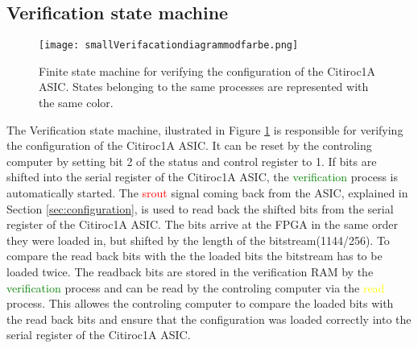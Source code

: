 \subsection{Verification state machine}
\begin{figure}[H]
    \centering
    \texttt{[image: smallVerifacationdiagrammodfarbe.png]}%
    \caption{Finite state machine for verifying the configuration of the Citiroc1A ASIC.
    States belonging to the same processes are represented with the same color.}
    \label{fig:Verification_state_machine}
\end{figure}
The Verification state machine, ilustrated in Figure \ref{fig:Verification_state_machine} is responsible for verifying the configuration of the Citiroc1A ASIC.
\newline
It can be reset by the controling computer by setting bit 2 of the status and control register to 1.
\newline
If bits are shifted into the serial register of the Citiroc1A ASIC, the \textcolor{green}{verification} process is automatically started.
The \textcolor{red}{srout} signal coming back from the ASIC, explained in Section \ref{sec:configuration}, is used to read back the shifted bits from the serial register of the Citiroc1A ASIC.
The bits arrive at the FPGA in the same order they were loaded in, but shifted by the length of the bitstream(1144/256). To compare the read back bits with the the loaded bits the bitstream has to be loaded twice.
\newline
The readback bits are stored in the verification RAM by the \textcolor{green}{verification} process and can be read by the controling computer via the  \textcolor{yellow}{read} process.
This allowes the controling computer to compare the loaded bits with the read back bits and ensure that the configuration was loaded correctly into the serial register of the Citiroc1A ASIC.
